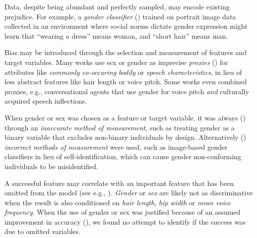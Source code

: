 \documentclass[nonacm,sigconf,review,balance=false]{acmart}
\begin{document}
 Data, despite being abundant and perfectly sampled, may encode existing prejudice. For example, a \emph{gender classifier} (\classifier) trained on portrait image data collected in an environment where social norms dictate gender expression might learn that ``wearing a dress'' means woman, and ``short hair'' means man.

 Bias may be introduced through the selection and measurement of features and target variables.
Many works use sex or gender as imprecise \emph{proxies} (\var) for attributes like \emph{commonly co-occuring bodily} or \emph{speech characteristics}, in lieu of less abstract features like hair length or voice pitch. Some works even combined proxies, e.g., conversational agents that use gender for voice pitch \emph{and} culturally acquired speech inflections.

When gender or sex was chosen as a feature or target variable, it was always (\binary) through an \emph{inaccurate method of measurement}, such as treating gender as a binary variable that excludes non-binary individuals by design. Alternatively (\classifier) \emph{incorrect methods of measurement} were used, such as image-based gender classifiers in lieu of self-identification, which can cause gender non-conforming individuals to be misidentified.

 A successful feature may correlate with an important feature that has been omitted from the model (see e.g., \cite{clarke2005phantom}). \emph{Gender} or \emph{sex} are likely not as discriminative when the result is also conditioned on \emph{hair length}, \emph{hip width} or \emph{mean voice frequency}. When the use of gender or sex was justified because of an assumed improvement in accuracy (\var), we found no attempt to identify if the success was due to omitted variables.
\end{document}
